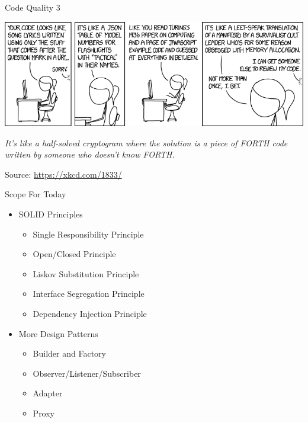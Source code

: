 
\begin{frame}[t,plain]
\titlepage
\end{frame}


\begin{frame}[fragile]{Code Quality 3}
%
\begin{center}
\includegraphics[width=.8\linewidth]{./gfx/17-xkcd-code_quality_3}

\vspace{12pt}
\emph{It's like a half-solved cryptogram where the solution is a piece of FORTH code written by someone who doesn't know FORTH.}

\vspace{6pt}
Source: \url{https://xkcd.com/1833/}
\end{center}
%
\end{frame}


\begin{frame}{Scope For Today}
%
\begin{itemize}
\item SOLID Principles
	\begin{itemize}
	\color{gray}
	\item Single Responsibility Principle
	\item Open/Closed Principle
	\color{black}
	\item Liskov Substitution Principle
	\item Interface Segregation Principle
	\item Dependency Injection Principle
	\end{itemize}
\item More Design Patterns
	\begin{itemize}
	\item Builder and Factory
	\item Observer/Listener/Subscriber
	\item Adapter
	\item Proxy
	\end{itemize}
\end{itemize}
%
\end{frame}

